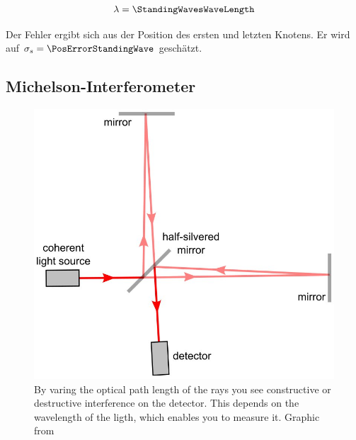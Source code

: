 \documentclass[a4paper,10pt,twocolumn]{article}
\begin{document}
    \begin{align*}
        \lambda = \StandingWavesWaveLength
    \end{align*}
    
    Der Fehler ergibt sich aus der Position des ersten und letzten Knotens.
    Er wird auf $\sigma_s = \PosErrorStandingWave$ geschätzt.
    
    \subsection{Michelson-Interferometer}

    \begin{figure}[htbp]
        \includegraphics[width=0.9\linewidth]{Interferometer}
        \center
        \caption{By varing the optical path length of the rays you see constructive or destructive interference on the
        detector. This depends on the wavelength of the ligth, which enables you to measure it.
        Graphic from~\cite{imageMichelsonInterferometerWiki}}
        \label{fig:Interferometer}
    \end{figure}
    
    
\end{document}
